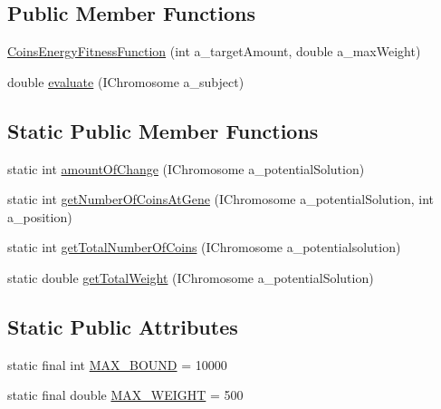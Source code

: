 \subsection*{Public Member Functions}
\begin{DoxyCompactItemize}
\item 
\hyperlink{classexamples_1_1energy_1_1_coins_energy_fitness_function_a758bc8c12c72af929451d1b836765fdf}{Coins\-Energy\-Fitness\-Function} (int a\-\_\-target\-Amount, double a\-\_\-max\-Weight)
\item 
double \hyperlink{classexamples_1_1energy_1_1_coins_energy_fitness_function_a647f56ab17e1de1ce724c104f960e375}{evaluate} (I\-Chromosome a\-\_\-subject)
\end{DoxyCompactItemize}
\subsection*{Static Public Member Functions}
\begin{DoxyCompactItemize}
\item 
static int \hyperlink{classexamples_1_1energy_1_1_coins_energy_fitness_function_a39b14edc81ee46d55ba8eb8e4b49343a}{amount\-Of\-Change} (I\-Chromosome a\-\_\-potential\-Solution)
\item 
static int \hyperlink{classexamples_1_1energy_1_1_coins_energy_fitness_function_ad0c2f852bfec71e3bee9f5da0299d3ea}{get\-Number\-Of\-Coins\-At\-Gene} (I\-Chromosome a\-\_\-potential\-Solution, int a\-\_\-position)
\item 
static int \hyperlink{classexamples_1_1energy_1_1_coins_energy_fitness_function_a445c98a57b3e2c4e4077625d873753b2}{get\-Total\-Number\-Of\-Coins} (I\-Chromosome a\-\_\-potentialsolution)
\item 
static double \hyperlink{classexamples_1_1energy_1_1_coins_energy_fitness_function_a784078a27e79464d231c85eed97ae5f2}{get\-Total\-Weight} (I\-Chromosome a\-\_\-potential\-Solution)
\end{DoxyCompactItemize}
\subsection*{Static Public Attributes}
\begin{DoxyCompactItemize}
\item 
static final int \hyperlink{classexamples_1_1energy_1_1_coins_energy_fitness_function_ac02e8fa7435c47582e6afcd04dd49d89}{M\-A\-X\-\_\-\-B\-O\-U\-N\-D} = 10000
\item 
static final double \hyperlink{classexamples_1_1energy_1_1_coins_energy_fitness_function_a2dcea27142210c447f29ef1ffb12fed3}{M\-A\-X\-\_\-\-W\-E\-I\-G\-H\-T} = 500
\end{DoxyCompactItemize}
